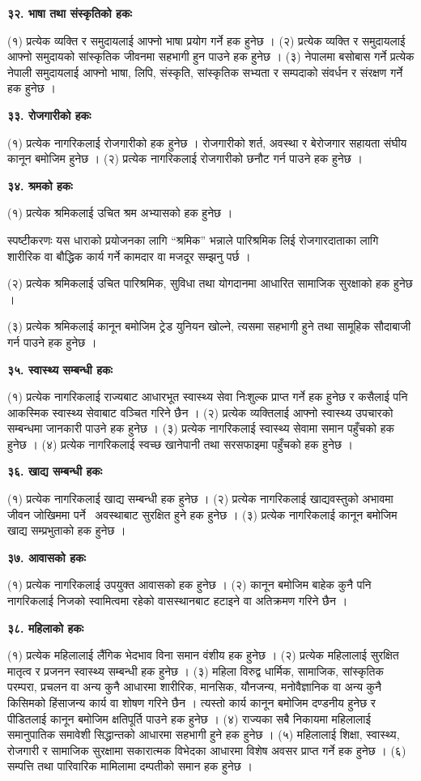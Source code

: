 \textbf{३२. भाषा तथा संस्कृतिको हकः}

(१) प्रत्येक व्यक्ति र समुदायलाई आफ्नो भाषा प्रयोग गर्ने हक हुनेछ ।
(२) प्रत्येक व्यक्ति र समुदायलाई आफ्नो समुदायको सांस्कृतिक जीवनमा सहभागी हुन पाउने हक हुनेछ ।
(३) नेपालमा बसोबास गर्ने प्रत्येक नेपाली समुदायलाई आफ्नो भाषा, लिपि, संस्कृति, सांस्कृतिक सभ्यता र सम्पदाको संवर्धन र संरक्षण गर्ने हक हुनेछ ।

\textbf{३३. रोजगारीको हकः}

(१) प्रत्येक नागरिकलाई रोजगारीको हक हुनेछ । रोजगारीको शर्त, अवस्था र बेरोजगार सहायता संघीय कानून बमोजिम हुनेछ ।
(२) प्रत्येक नागरिकलाई रोजगारीको छनौट गर्न पाउने हक हुनेछ ।

\textbf{३४. श्रमको हकः}

(१) प्रत्येक श्रमिकलाई उचित श्रम अभ्यासको हक हुनेछ ।

स्पष्टीकरणः यस धाराको प्रयोजनका लागि “श्रमिक” भन्नाले पारिश्रमिक लिई रोजगारदाताका लागि शारीरिक वा बौद्धिक कार्य गर्ने कामदार वा मजदूर सम्झनु पर्छ ।

(२) प्रत्येक श्रमिकलाई उचित पारिश्रमिक, सुविधा तथा योगदानमा आधारित सामाजिक सुरक्षाको हक हुनेछ ।

(३) प्रत्येक श्रमिकलाई कानून बमोजिम ट्रेड युनियन खोल्ने, त्यसमा सहभागी हुने तथा सामूहिक सौदाबाजी गर्न पाउने हक हुनेछ ।

\textbf{३५. स्वास्थ्य सम्बन्धी हकः}

(१) प्रत्येक नागरिकलाई राज्यबाट आधारभूत स्वास्थ्य सेवा निःशुल्क प्राप्त गर्ने हक हुनेछ र कसैलाई पनि आकस्मिक स्वास्थ्य
सेवाबाट वञ्चित गरिने छैन ।
(२) प्रत्येक व्यक्तिलाई आफ्नो स्वास्थ्य उपचारको सम्बन्धमा जानकारी पाउने हक हुनेछ ।
(३) प्रत्येक नागरिकलाई स्वास्थ्य सेवामा समान पहुँचको हक हुनेछ ।
(४) प्रत्येक नागरिकलाई स्वच्छ खानेपानी तथा सरसफाइमा पहुँचको हक हुनेछ ।

\textbf{३६. खाद्य सम्बन्धी हकः }

(१) प्रत्येक नागरिकलाई खाद्य सम्बन्धी हक हुनेछ ।
(२) प्रत्येक नागरिकलाई खाद्यवस्तुको अभावमा जीवन जोखिममा पर्ने  अवस्थाबाट सुरक्षित हुने हक हुनेछ ।
(३) प्रत्येक नागरिकलाई कानून बमोजिम खाद्य सम्प्रभुताको हक हुनेछ ।

\textbf{३७. आवासको हकः}

(१) प्रत्येक नागरिकलाई उपयुक्त आवासको हक हुनेछ ।
(२) कानून बमोजिम बाहेक कुनै पनि नागरिकलाई निजको स्वामित्वमा रहेको वासस्थानबाट हटाइने वा अतिक्रमण गरिने छैन ।

\textbf{३८. महिलाको हकः}

(१) प्रत्येक महिलालाई लैंगिक भेदभाव विना समान वंशीय हक हुनेछ ।
(२) प्रत्येक महिलालाई सुरक्षित मातृत्व र प्रजनन स्वास्थ्य सम्बन्धी हक हुनेछ ।
(३) महिला विरुद्व धार्मिक, सामाजिक, सांस्कृतिक परम्परा, प्रचलन वा अन्य कुनै आधारमा शारीरिक, मानसिक, यौनजन्य, मनोवैज्ञानिक वा अन्य कुनै किसिमको हिंसाजन्य कार्य वा शोषण गरिने छैन । त्यस्तो कार्य कानून बमोजिम दण्डनीय हुनेछ र पीडितलाई कानून बमोजिम क्षतिपूर्ति पाउने हक हुनेछ ।
(४) राज्यका सबै निकायमा महिलालाई समानुपातिक समावेशी सिद्धान्तको आधारमा सहभागी हुने हक हुनेछ ।
(५) महिलालाई शिक्षा, स्वास्थ्य, रोजगारी र सामाजिक सुरक्षामा सकारात्मक विभेदका आधारमा विशेष अवसर प्राप्त गर्ने हक हुनेछ ।
(६) सम्पत्ति तथा पारिवारिक मामिलामा दम्पतीको समान हक हुनेछ ।


